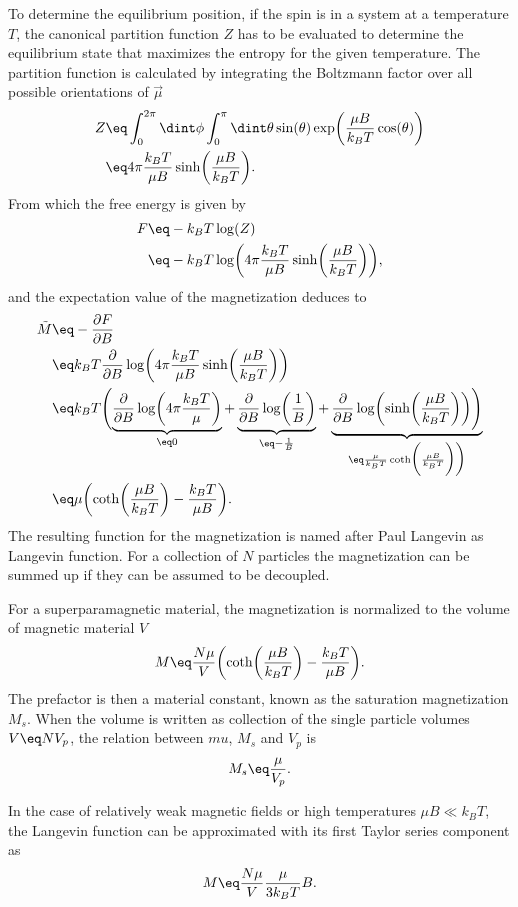 \documentclass[\main/dresen_thesis.tex]{subfiles}
\begin{document}
To determine the equilibrium position, if the spin is in a system at a temperature $T$, the canonical partition function $Z$ has to be evaluated to determine the equilibrium state that maximizes the entropy for the given temperature.
The partition function is calculated by integrating the Boltzmann factor over all possible orientations of $\vec{\mu}$
\begin{align}
  Z \eq& \int_0^{2\pi} \dint \phi \int_0^\pi \dint \theta \sin(\theta) \exp \biggl(\frac{\mu B}{k_B T} \cos(\theta) \biggr)\\
  \eq& 4 \pi \frac{k_B T}{ \mu B} \sinh \biggl( \frac{\mu B}{k_B T} \biggr).
\end{align}
From which the free energy is given by
\begin{align}
  F \eq& -k_B T \log(Z)\\
  \eq& -k_B T \log \biggl( 4 \pi \frac{k_B T}{ \mu B}  \sinh \biggl( \frac{\mu B}{k_B T} \biggr) \biggr),
\end{align}
and the expectation value of the magnetization deduces to
\begin{align}
  \tilde{M} \eq& - \frac{\partial F}{\partial B}\\
  \eq& k_B T \frac{\partial}{\partial B} \log \biggl( 4 \pi \frac{k_B T}{ \mu B}  \sinh \biggl( \frac{\mu B}{k_B T} \biggr) \biggr)\\
  \eq& k_B T \Biggl(
    \underbrace{\frac{\partial}{\partial B} \log \biggl( 4 \pi \frac{k_B T}{ \mu } \biggr)}_{\eq 0}
  + \underbrace{\frac{\partial}{\partial B} \log \biggl( \frac{1}{B} \biggr)}_{\eq - \frac{1}{B}}
  + \underbrace{\frac{\partial}{\partial B}\log  \biggl(  \sinh \biggl( \frac{\mu B}{k_B T} \biggr) \biggr) \Biggr)}_{\eq \frac{\mu }{k_B T} \coth \biggl( \frac{\mu B}{k_B T} \biggr) \biggr)}\\
  \eq& \mu \biggl(\coth \biggl( \frac{\mu B}{k_B T} \biggr) - \frac{k_B T}{\mu B} \biggr).
\end{align}
The resulting function for the magnetization is named after Paul Langevin as Langevin function.
For a collection of $N$ particles the magnetization can be summed up if they can be assumed to be decoupled.

For a superparamagnetic material, the magnetization is normalized to the volume of magnetic material $V$
\begin{align}
  M \eq \frac{N \mu}{V} \biggl(\coth \biggl( \frac{\mu B}{k_B T} \biggr) - \frac{k_B T}{\mu B} \biggr).
\end{align}
The prefactor is then a material constant, known as the saturation magnetization $M_s$.
When the volume is written as collection of the single particle volumes $V \eq N V_p$, the relation between $mu$, $M_s$ and $V_p$ is
\begin{align}
  M_s \eq \frac{\mu}{V_p}.
\end{align}

In the case of relatively weak magnetic fields or high temperatures $\mu B \ll k_B T$, the Langevin function can be approximated with its first Taylor series component as
\begin{align}
  M \eq \frac{N \mu}{V} \frac{\mu}{3 k_B T} B.
\end{align}
\end{document}
